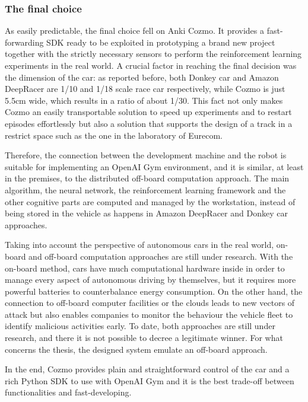 \subsubsection{The final choice}

As easily predictable, the final choice fell on Anki Cozmo. It provides a fast-forwarding SDK ready to be exploited in prototyping a brand new project together with the strictly necessary sensors to perform the reinforcement learning experiments in the real world.
A crucial factor in reaching the final decision was the dimension of the car: as reported before, both Donkey car and Amazon DeepRacer are 1/10 and 1/18 scale race car respectively, while Cozmo is just 5.5cm wide, which results in a ratio of about 1/30. This fact not only makes Cozmo an easily transportable solution to speed up experiments and to restart episodes effortlessly but also a solution that supports the design of a track in a restrict space such as the one in the laboratory of Eurecom.

Therefore, the connection between the development machine and the robot is suitable for implementing an OpenAI Gym environment, and it is similar, at least in the premises, to the distributed off-board computation approach. The main algorithm, the neural network, the reinforcement learning framework and the other cognitive parts are computed and managed by the workstation, instead of being stored in the vehicle as happens in Amazon DeepRacer and Donkey car approaches.

Taking into account the perspective of autonomous cars in the real world, on-board and off-board computation approaches are still under research. With the on-board method, cars have much computational hardware inside in order to manage every aspect of autonomous driving by themselves, but it requires more powerful batteries to counterbalance energy consumption. On the other hand, the connection to off-board computer facilities or the clouds leads to new vectors of attack but also enables companies to monitor the behaviour the vehicle fleet to identify malicious activities early.
To date, both approaches are still under research, and there it is not possible to decree a legitimate winner. For what concerns the thesis, the designed system emulate an off-board approach.

In the end, Cozmo provides plain and straightforward control of the car and a rich Python SDK to use with OpenAI Gym and it is the best trade-off between functionalities and fast-developing.


